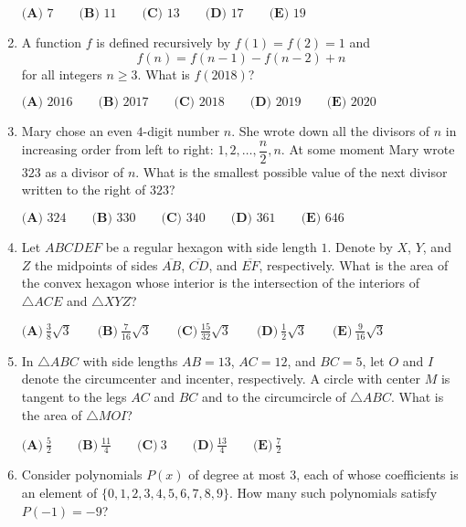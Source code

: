 \documentclass{article}
\begin{document}
\begin{enumerate}[label=\arabic*., itemsep=0.5em]
\(\textbf{(A) } 7 \qquad \textbf{(B) } 11 \qquad \textbf{(C) } 13 \qquad \textbf{(D) } 17 \qquad \textbf{(E) } 19 \)\par \vspace{0.5em}\item A function \(f\) is defined recursively by \(f(1)=f(2)=1\) and 
\begin{equation*}
f(n)=f(n-1)-f(n-2)+n
\end{equation*}
for all integers \(n \geq 3\). What is \(f(2018)\)?

\(\textbf{(A) } 2016 \qquad \textbf{(B) } 2017 \qquad \textbf{(C) } 2018 \qquad \textbf{(D) } 2019 \qquad \textbf{(E) } 2020\)\par \vspace{0.5em}\item Mary chose an even \(4\)-digit number \(n\). She wrote down all the divisors of \(n\) in increasing order from left to right: \(1,2,\ldots,\dfrac{n}{2},n\). At some moment Mary wrote \(323\) as a divisor of \(n\). What is the smallest possible value of the next divisor written to the right of \(323\)?

\(\textbf{(A) } 324 \qquad \textbf{(B) } 330 \qquad \textbf{(C) } 340 \qquad \textbf{(D) } 361 \qquad \textbf{(E) } 646\)\par \vspace{0.5em}\item Let \(ABCDEF\) be a regular hexagon with side length \(1\). Denote by \(X\), \(Y\), and \(Z\) the midpoints of sides \(\overline {AB}\), \(\overline{CD}\), and \(\overline{EF}\), respectively. What is the area of the convex hexagon whose interior is the intersection of the interiors of \(\triangle ACE\) and \(\triangle XYZ\)?

\(\textbf{(A)}\ \frac {3}{8}\sqrt{3} \qquad \textbf{(B)}\ \frac {7}{16}\sqrt{3} \qquad \textbf{(C)}\ \frac {15}{32}\sqrt{3} \qquad  \textbf{(D)}\ \frac {1}{2}\sqrt{3} \qquad \textbf{(E)}\ \frac {9}{16}\sqrt{3} \)\par \vspace{0.5em}\item In \(\triangle{ABC}\) with side lengths \(AB = 13\), \(AC = 12\), and \(BC = 5\), let \(O\) and \(I\) denote the circumcenter and incenter, respectively. A circle with center \(M\) is tangent to the legs \(AC\) and \(BC\) and to the circumcircle of \(\triangle{ABC}\). What is the area of \(\triangle{MOI}\)?

\(\textbf{(A)}\ \frac52\qquad\textbf{(B)}\ \frac{11}{4}\qquad\textbf{(C)}\ 3\qquad\textbf{(D)}\ \frac{13}{4}\qquad\textbf{(E)}\ \frac72\)\par \vspace{0.5em}\item Consider polynomials \(P(x)\) of degree at most \(3\), each of whose coefficients is an element of \(\{0, 1, 2, 3, 4, 5, 6, 7, 8, 9\}\). How many such polynomials satisfy \(P(-1) = -9\)?


\end{enumerate}
\end{document}
